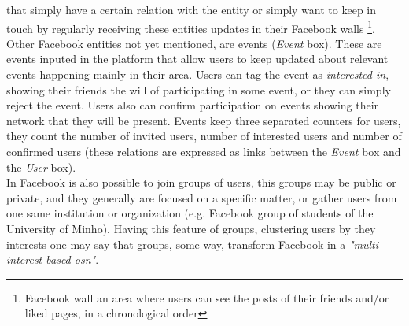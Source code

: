 that simply have a certain relation with the entity or simply want to keep in touch by regularly receiving these entities updates in their Facebook walls
\footnote{Facebook wall an area where users can see the posts of their friends and/or liked pages, in a chronological order}.\\
\indent Other Facebook entities not yet mentioned, are events (\textit{Event} box). These are events inputed in the platform that allow
users to keep updated about relevant events happening mainly in their area. Users can tag the event as \textit{interested in}, showing their friends
the will of participating in some event, or they can simply reject the event. Users also can confirm participation on events
showing their network that they will be present. Events keep three separated counters for users, they count the number of invited users, number of
interested users and number of confirmed users (these relations are expressed as links between the \textit{Event} box and the \textit{User} box).\\
\indent In Facebook is also possible to join groups of users, this groups may be public or private, and they generally are focused on a specific matter,
or gather users from one same institution or organization (e.g. Facebook group of students of the University of Minho).
Having this feature of groups, clustering users by they interests one may say that groups, some way, transform Facebook in a \textit{"multi interest-based \gls{osn}"}.

